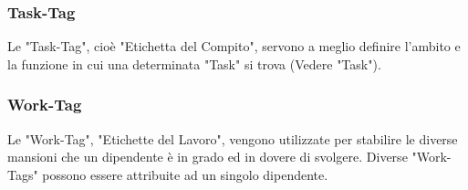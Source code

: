 \documentclass{report}
\begin{document}
\subsubsection*{Task-Tag}
Le "Task-Tag", cioè "Etichetta del Compito", servono a meglio definire l'ambito e la funzione in cui una determinata "Task" si trova (Vedere "Task").
\subsubsection*{Work-Tag}
Le "Work-Tag", "Etichette del Lavoro", vengono utilizzate per stabilire le diverse mansioni che un dipendente è in grado ed in dovere di svolgere. Diverse "Work-Tags" possono essere attribuite ad un singolo dipendente.
\end{document}
